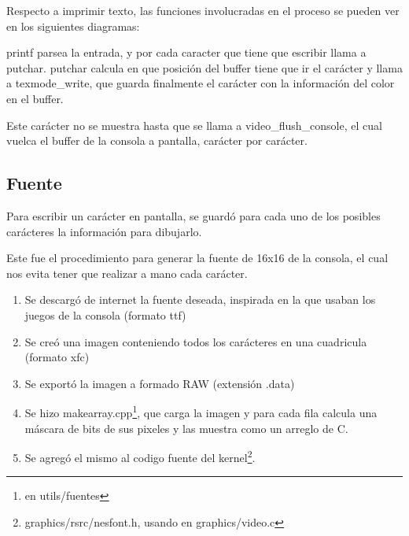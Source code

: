 Respecto a imprimir texto, las funciones involucradas en el proceso se pueden ver en los siguientes diagramas:
printf parsea la entrada, y por cada caracter que tiene que escribir llama a putchar. putchar calcula en que posición del buffer tiene que ir el carácter y llama a texmode\_write, que guarda finalmente el carácter con la información del color en el buffer.

Este carácter no se muestra hasta que se llama a video\_flush\_console, el cual vuelca el buffer de la consola a pantalla, carácter por carácter.

\subsection{Fuente}
Para escribir un carácter en pantalla, se guardó para cada uno de los posibles carácteres la información para dibujarlo.

\setlength\fboxsep{10pt}
\setlength\fboxrule{0pt}

Este fue el procedimiento para generar la fuente de 16x16 de la consola, el cual nos evita tener que realizar a mano cada carácter.
\begin{enumerate}
\item Se descargó de internet la fuente deseada, inspirada en la que usaban los juegos de la consola (formato ttf)
\item Se creó una imagen conteniendo todos los carácteres en una cuadricula (formato xfc)
\item Se exportó la imagen a formado RAW (extensión .data)
\item Se hizo makearray.cpp\footnote{en utils/fuentes}, que carga la imagen y para cada fila calcula una máscara de bits de sus pixeles y las muestra como un arreglo de C.
\item Se agregó el mismo al codigo fuente del kernel\footnote{graphics/rsrc/nesfont.h, usando en graphics/video.c}.	
\end{enumerate}

